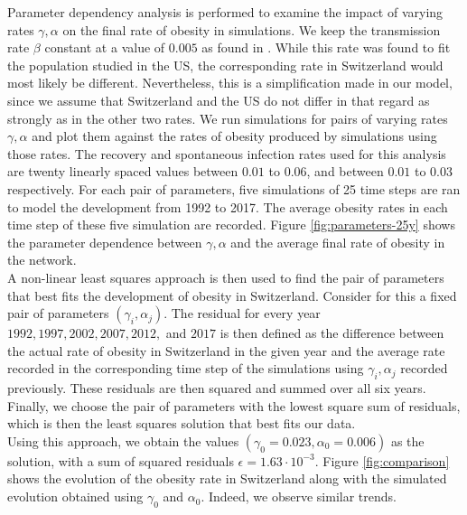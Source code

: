 \documentclass[11pt]{article}
\begin{document}
\FloatBarrier
Parameter dependency analysis is performed to examine the impact of varying rates \(\gamma, \alpha\) on the final rate of obesity in simulations. We keep the transmission rate \(\beta\) constant at a value of \(0.005\) as found in \cite{infectiousDiseaseModeling}. While this rate was found to fit the population studied in the US, the corresponding rate in Switzerland would most likely be different. Nevertheless, this is a simplification made in our model, since we assume that Switzerland and the US do not differ in that regard as strongly as in the other two rates. We run simulations for pairs of varying rates \(\gamma, \alpha\) and plot them against the rates of obesity produced by simulations using those rates. The recovery and spontaneous infection rates used for this analysis are twenty linearly spaced values between \(0.01\) to \(0.06\), and between \(0.01\) to \(0.03\) respectively. For each pair of parameters, five simulations of 25 time steps are ran to model the development from 1992 to 2017. The average obesity rates in each time step of these five simulation are recorded. Figure \ref{fig:parameters-25y} shows the parameter dependence between \(\gamma, \alpha\) and the average final rate of obesity in the network. \\

A non-linear least squares approach is then used to find the pair of parameters that best fits the development of obesity in Switzerland\cite{bmistatistics}. Consider for this a fixed pair of parameters \((\gamma_i, \alpha_j)\). The residual for every year \(1992, 1997, 2002, 2007, 2012,\) and \(2017\) is then defined as the difference between the actual rate of obesity in Switzerland in the given year and the average rate recorded in the corresponding time step of the simulations using \(\gamma_i, \alpha_j\) recorded previously. These residuals are then squared and summed over all six years. Finally, we choose the pair of parameters with the lowest square sum of residuals, which is then the least squares solution that best fits our data. \\

Using this approach, we obtain the values \((\gamma_0 = 0.023, \alpha_0 = 0.006)\) as the solution, with a sum of squared residuals $\epsilon = 1.63 \cdot 10^{-3}$. Figure \ref{fig:comparison} shows the evolution of the obesity rate in Switzerland along with the simulated evolution obtained using \(\gamma_0\) and \(\alpha_0\). Indeed, we observe similar trends. \\
\end{document}
